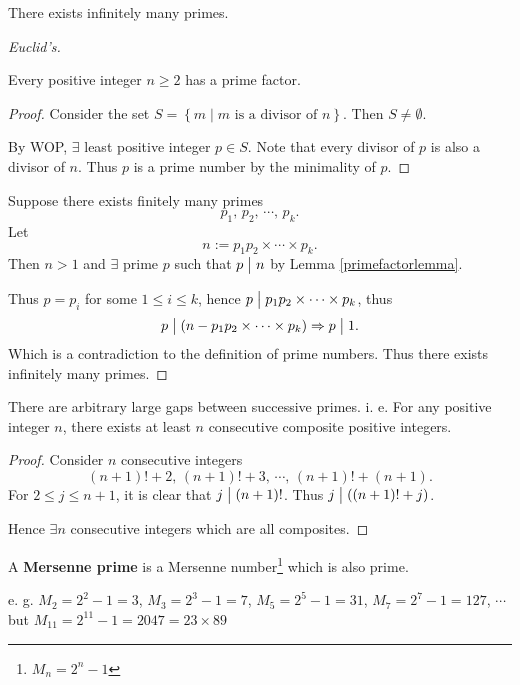 \begin{theorem}
    There exists infinitely many primes.
\end{theorem}

\begin{proof}[Euclid's]
    \begin{lemma}\label{primefactorlemma}
        Every positive integer $n \geq 2$ has a prime factor.
    \end{lemma}

    \begin{proof}
        Consider the set $S=\left\{m \mid m\mbox{ is a divisor of }n\right\}$.
        Then $S \neq \emptyset$.

        By WOP, $\exists$ least positive integer $p\in S$. Note that
        every divisor of $p$ is also a divisor of $n$.
        Thus $p$ is a prime number by the minimality of $p$.
    \end{proof}

    Suppose there exists finitely many primes
    \[
        p_1,\,p_2,\,\cdots,\,p_k.    
    \]
    Let
    \[
        n := p_1p_2\times\cdots\times p_k.    
    \]
    Then $n > 1$ and $\exists$ prime $p$ such that $p\bigm| n$ by Lemma \ref{primefactorlemma}.

    Thus $p=p_i$ for some $1 \leq i \leq k$, hence $p \bigm| p_1p_2\times\cdots\times p_k$, thus
    \[
        p \bigm| \left(n-p_1p_2\times\cdots\times p_k\right)
        \Rightarrow p\bigm| 1.
    \]
    Which is a contradiction to the definition of prime numbers. Thus there exists infinitely many primes.
\end{proof}

\begin{theorem}
    There are arbitrary large gaps between successive primes.
    i. e. For any positive integer $n$, there exists at least $n$ consecutive composite
    positive integers.
\end{theorem}

\begin{proof}
    Consider $n$ consecutive integers
    \[
        \left(n+1\right)!+2,\,\left(n+1\right)!+3,\,\cdots,\,\left(n+1\right)!+\left(n+1\right).
    \]
    For $2\leq j \leq n+1$, it is clear that $j \bigm| \left(n+1\right)!$.
    Thus $j \bigm| \left(\left(n+1\right)!+j\right)$.

    Hence $\exists n$ consecutive integers which are all composites.
\end{proof}

\begin{definition}
    A \textbf{Mersenne prime} is a Mersenne number\footnote{$M_n = 2^n - 1$}
    which is also prime.
\end{definition}

e. g. $M_2 = 2^2-1 = 3$, $M_3 = 2^3-1 = 7$, $M_5 = 2^5-1 = 31$,
$M_7 = 2^7-1 = 127$, $\cdots$ but $M_{11} = 2^{11}-1 = 2047 = 23 \times 89$